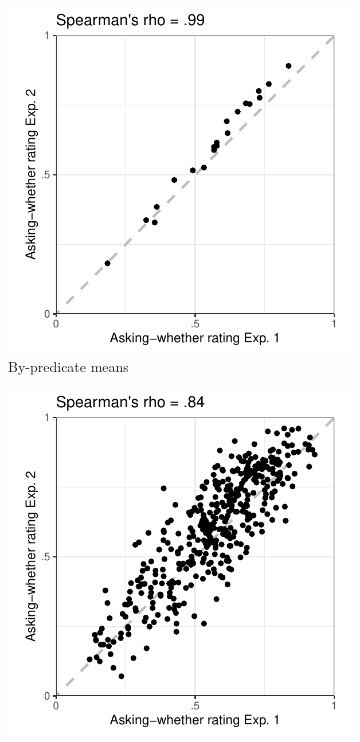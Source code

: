 \documentclass[11pt,fleqn]{article}
\newcommand{\6}{\mbox{$[\hspace*{-.6mm}[$}}
\newcommand{\9}{\mbox{$]\hspace*{-.6mm}]$}}
\begin{document}
\begin{figure}[h!]
\centering
\begin{subfigure}[t]{.3\textwidth}
\centering
\includegraphics[width=\textwidth]{../../results/exp1/graphs/SUP-ai-Exp1-by-Exp2}
\caption{By-predicate means}
 \end{subfigure}\hfill
\begin{subfigure}[t]{.3\textwidth}
\centering
\includegraphics[width=\textwidth]{../../results/exp1/graphs/SUP-ai-PredItem-Exp1-by-Exp2}

\end{subfigure}
\end{figure}
\end{document}
